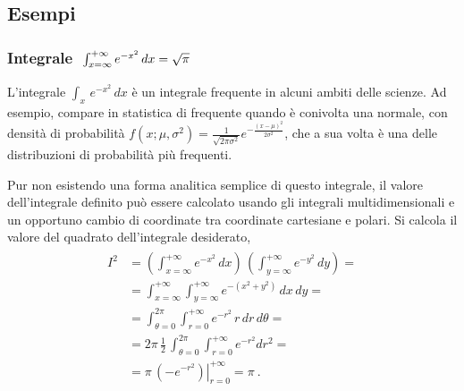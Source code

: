 \documentclass[letterpaper,10pt,italian]{jupyterBook}
\begin{document}
\subsection{Esempi}
\label{\detokenize{ch/multivariable-calculus/integrals:esempi}}\label{\detokenize{ch/multivariable-calculus/integrals:multivariable-calculus-integrals-examples}}

\subsubsection{Integrale \protect\(\ \int_{x = \infty}^{+\infty} e^{-x^2} \, dx = \sqrt{\pi}\protect\)}
\label{\detokenize{ch/multivariable-calculus/integrals:integrale-int-x-infty-infty-e-x-2-dx-sqrt-pi}}\label{\detokenize{ch/multivariable-calculus/integrals:integral-etox2}}
\sphinxAtStartPar
L’integrale \(\int_{x} \, e^{-x^2} \, dx\) è un integrale frequente in alcuni ambiti delle scienze. Ad esempio, compare in statistica di frequente quando è conivolta una  normale, con densità di probabilità \(f(x;\mu,\sigma^2) = \frac{1}{\sqrt{2\pi\sigma^2}} e^{-\frac{(x-\mu)^2}{2\sigma^2}}\), che a sua volta è una delle distribuzioni di probabilità più frequenti.

\sphinxAtStartPar
Pur non esistendo una forma analitica semplice di questo integrale, il valore dell’integrale definito può essere calcolato usando gli integrali multidimensionali e un opportuno cambio di coordinate tra coordinate cartesiane e polari. Si calcola il valore del quadrato dell’integrale desiderato,
\begin{equation*}
\begin{split}\begin{aligned}
  I^2 
  & = \left( \int_{x = \infty}^{+\infty} e^{-x^2} \, dx \right) \, \left( \int_{y = \infty}^{+\infty} e^{-y^2} \, dy \right) = \\
  & = \int_{x = \infty}^{+\infty} \int_{y = \infty}^{+\infty}  e^{-(x^2+y^2)} \, dx \, dy  = \\
  & = \int_{\theta = 0}^{2\pi} \int_{r = 0}^{+\infty}  e^{-r^2} \, r \,  dr \, d \theta  = \\
  & = 2 \pi \, \frac{1}{2} \, \int_{\theta = 0}^{2\pi} \int_{r = 0}^{+\infty}  e^{-r^2} d r^2 = \\
  & = \pi \, \left. \left( - e^{-r^2} \right)\right|_{r=0}^{+\infty} = \pi \ .
\end{aligned}\end{split}
\end{equation*}
\sphinxstepscope
\end{document}
